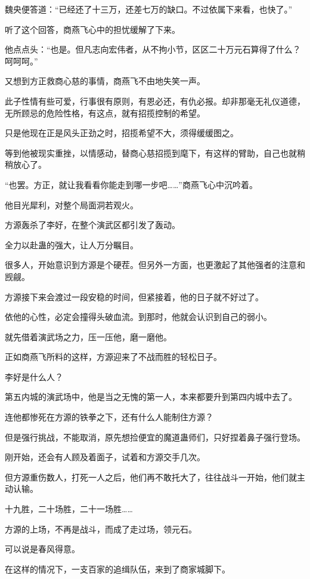 \begin{this_body}
魏央便答道：“已经还了十三万，还差七万的缺口。不过依属下来看，也快了。”

听了这个回答，商燕飞心中的担忧缓解了下来。

他点点头：“也是。但凡志向宏伟者，从不拘小节，区区二十万元石算得了什么？呵呵呵。”

又想到方正救商心慈的事情，商燕飞不由地失笑一声。

此子性情有些可爱，行事很有原则，有恩必还，有仇必报。却非那毫无礼仪道德，无所顾忌的危险性格，有这点，就有招揽控制的希望。

只是他现在正是风头正劲之时，招揽希望不大，须得缓缓图之。

等到他被现实重挫，以情感动，替商心慈招揽到麾下，有这样的臂助，自己也就稍稍放心了。

“也罢。方正，就让我看看你能走到哪一步吧……”商燕飞心中沉吟着。

他目光犀利，对整个局面洞若观火。

方源轰杀了李好，在整个演武区都引发了轰动。

全力以赴蛊的强大，让人万分瞩目。

很多人，开始意识到方源是个硬茬。但另外一方面，也更激起了其他强者的注意和觊觎。

方源接下来会渡过一段安稳的时间，但紧接着，他的日子就不好过了。

依他的心性，必定会撞得头破血流。到那时，他就会认识到自己的弱小。

就先借着演武场之力，压一压他，磨一磨他。

正如商燕飞所料的这样，方源迎来了不战而胜的轻松日子。

李好是什么人？

第五内城的演武场中，他是当之无愧的第一人，本来都要升到第四内城中去了。

连他都惨死在方源的铁拳之下，还有什么人能制住方源？

但是强行挑战，不能取消，原先想捡便宜的魔道蛊师们，只好捏着鼻子强行登场。

刚开始，还会有人顾及着面子，试着和方源交手几次。

但方源重伤数人，打死一人之后，他们再不敢托大了，往往战斗一开始，他们就主动认输。

十九胜，二十场胜，二十一场胜……

方源的上场，不再是战斗，而成了走过场，领元石。

可以说是春风得意。

在这样的情况下，一支百家的追缉队伍，来到了商家城脚下。

\end{this_body}

